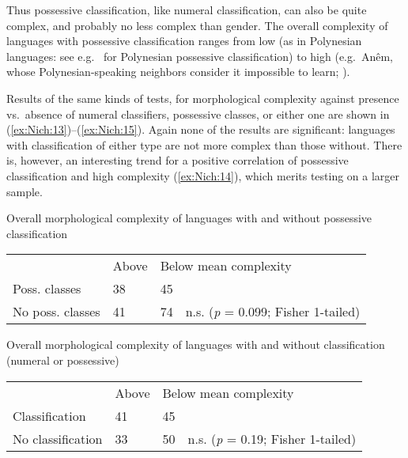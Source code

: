 \documentclass[output=collectionpaper]{langsci/langscibook}
\begin{document}
Thus possessive classification, like numeral classification, can also be quite complex, and probably no less complex than gender. The overall complexity of languages with possessive classification ranges from low (as in Polynesian languages: see e.g.\ \citealt{Wilson1982} for Polynesian possessive classification) to high (e.g.\ Anêm, whose Polynesian-speaking neighbors consider it impossible to learn; \citealt[51]{Thurston1982}).

Results of the same kinds of tests, for morphological complexity against presence vs.\ absence of numeral classifiers, possessive classes, or either one are shown in (\ref{ex:Nich:13})--(\ref{ex:Nich:15}). Again none of the results are significant: languages with classification of either type are not more complex than those without. There is, however, an interesting trend for a positive correlation of possessive classification and high complexity (\ref{ex:Nich:14}), which merits testing on a larger sample.

%

\ea
\label{ex:Nich:14}
Overall morphological complexity of languages with and without possessive classification\\
\medskip
\begin{tabular}{p{2.7cm}p{1.3cm}p{1.3cm}l}
				 &Above 	 &	\multicolumn{2}{l}{Below mean complexity} \\
	Poss. classes	 &	38	 &	45 \\
	No poss. classes	 &41	 &	74	 &n.s. (\textit{p} = 0.099; Fisher 1-tailed)	  \\
\end{tabular}
\z

\ea
\label{ex:Nich:15}
Overall morphological complexity of languages with and without classification (numeral or possessive)\\
\medskip
\begin{tabular}{p{2.7cm}p{1.3cm}p{1.3cm}l}
				 &Above 	 &	\multicolumn{2}{l}{Below mean complexity} \\
	Classification		 &41	 &	45 \\
	No classification	 &33	 &	50 &	n.s.  (\textit{p} = 0.19; Fisher 1-tailed) \\
\end{tabular}
\z
\end{document}
